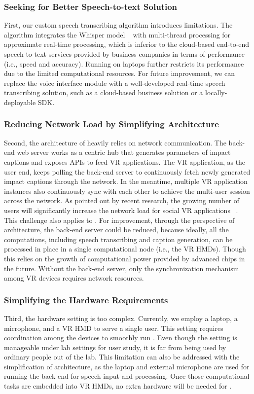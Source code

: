 \subsubsection{Seeking for Better Speech-to-text Solution}
First, our custom speech transcribing algorithm introduces limitations.
The algorithm integrates the Whisper model ~\cite{radford2023robust} with multi-thread processing for approximate real-time processing, which is inferior to the cloud-based end-to-end speech-to-text services provided by business companies in terms of performance (i.e., speed and accuracy). 
Running on laptops further restricts its performance due to the limited computational resources.
For future improvement, we can replace the voice interface module with a well-developed real-time speech transcribing solution, such as a cloud-based business solution or a locally-deployable SDK.

\subsubsection{Reducing Network Load by Simplifying Architecture}
Second, the architecture of \system{} heavily relies on network communication.
The back-end web server works as a centric hub that generates parameters of impact captions and exposes APIs to feed VR applications.
The VR application, as the user end, keeps polling the back-end server to continuously fetch newly generated impact captions through the network. In the meantime, multiple VR application instances also continuously sync with each other to achieve the multi-user session across the network.
As pointed out by recent research, the growing number of users will significantly increase the network load for social VR applications ~\cite{cheng2022we}. This challenge also applies to \system{}.
For improvement, through the perspective of architecture, the back-end server could be reduced, because ideally, all the computations, including speech transcribing and caption generation, can be processed in place in a single computational node (i.e., the VR HMDs). Though this relies on the growth of computational power provided by advanced chips in the future. 
Without the back-end server, only the synchronization mechanism among VR devices requires network resources.

\subsubsection{Simplifying the Hardware Requirements}
Third, the hardware setting is too complex. Currently, we employ a laptop, a microphone, and a VR HMD to serve a single user. This setting requires coordination among the devices to smoothly run \system{}. Even though the setting is manageable under lab settings for user study, it is far from being used by ordinary people out of the lab.
This limitation can also be addressed with the simplification of architecture, as the laptop and external microphone are used for running the back end for speech input and processing. Once those computational tasks are embedded into VR HMDs, no extra hardware will be needed for \system{}.


